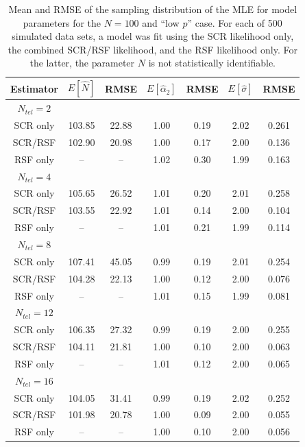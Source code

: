 \documentclass[12pt]{article}
\begin{document}
\begin{table}
\centering
\caption{Mean and RMSE of the sampling distribution of the MLE for
  model parameters for the $N=100$ and ``low $p$'' case. For each of
  500 simulated data sets, a model was fit using the SCR likelihood
  only, the combined SCR/RSF likelihood, and the RSF likelihood only. For
  the latter, the parameter $N$ is not statistically identifiable. }
\begin{tabular}{ccccccc}
\hline \hline
Estimator & $E[\hat{N}]$ & RMSE & $E[\hat{\alpha}_{2}]$ & RMSE &
$E[\hat{\sigma}]$ & RMSE \\
 \hline
$N_{tel} = 2$ &      &      &       &      &    &      \\
SCR only     &103.85& 22.88&   1.00& 0.19& 2.02& 0.261 \\
SCR/RSF      &102.90& 20.98&   1.00& 0.17& 2.00& 0.136\\
RSF only     &--    & --   &  1.02 & 0.30& 1.99& 0.163\\
$N_{tel}=4$   &      &      &       &     &     &        \\
SCR only     &105.65& 26.52&   1.01& 0.20& 2.01& 0.258 \\
SCR/RSF      &103.55& 22.92&   1.01& 0.14& 2.00& 0.104\\
RSF only     & --   & --   &  1.01 & 0.21& 1.99& 0.114\\
$N_{tel}=8$   &      &      &       &     &     &       \\
SCR only     &107.41&  45.05&   0.99& 0.19& 2.01& 0.254 \\
SCR/RSF      &104.28&  22.13&   1.00& 0.12& 2.00& 0.076\\
RSF only     &--    & --    &  1.01& 0.15& 1.99& 0.081\\
$N_{tel}=12$  &      &       &      &     &      &      \\
SCR only     &106.35&  27.32& 0.99& 0.19 & 2.00& 0.255\\
SCR/RSF      &104.11&  21.81& 1.00& 0.10 & 2.00& 0.063\\
RSF only     & --   &  --   & 1.01& 0.12 & 2.00& 0.065\\
$N_{tel}=16$  &      &       &     &      &     &       \\
SCR only     &104.05&  31.41& 0.99& 0.19 & 2.02& 0.252\\
SCR/RSF      &101.98&  20.78& 1.00& 0.09 & 2.00& 0.055\\
RSF only     & --   &  --   & 1.00& 0.10 & 2.00& 0.056\\
\end{tabular}
\label{tab.lowp}
\end{table}
\end{document}
